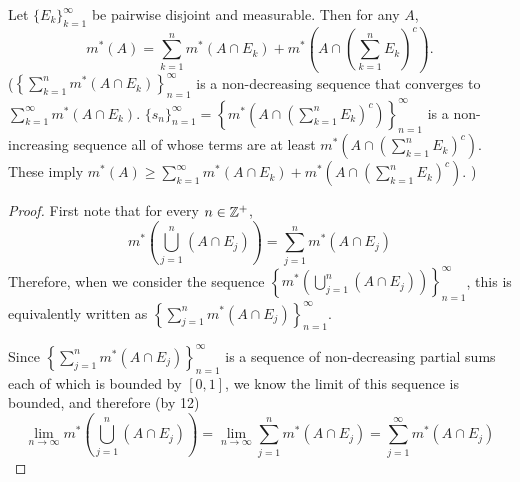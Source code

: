 \begin{pblm}%
	Let $\{E_k\}_{k=1}^\infty$ be pairwise disjoint and measurable. Then 
	for any $A$, 
	\begin{equation*}
		m^\ast(A) = \sum\limits_{k=1}^nm^\ast(A\cap E_k)+m^\ast
		\left(A\cap\left(\sum\limits_{k=1}^nE_k\right)^c\right).
	\end{equation*}
	($\left\{\sum\limits_{k=1}^n m^\ast(A\cap E_k)\right\}_{n=1}^\infty$ 
	is a non-decreasing sequence that converges to 
	$\sum\limits_{k=1}^\infty m^\ast(A\cap E_k)$.  
	$\{s_n\}_{n=1}^\infty = 
	\left\{
		m^\ast \left(A\cap\left(\sum\limits_{k=1}^nE_k\right)^c\right)
	\right\}_{n=1}^\infty$ 
	is a non-increasing sequence all of whose terms are at least 
	$m^\ast \left(A\cap\left(\sum\limits_{k=1}^nE_k\right)^c\right).$ These 
	imply $m^\ast (A) \ge \sum\limits_{k=1}^\infty m^\ast(A\cap E_k) + 
	m^\ast \left(A\cap\left(\sum\limits_{k=1}^nE_k\right)^c\right).$ )
\begin{proof}
	First note that for every $n \in \mathbb{Z}^+$, 
	\begin{equation*}
		m^\ast\left(\bigcup\limits_{j=1}^n(A\cap E_j)\right) = \sum\limits_{j=1}^n m^\ast(A \cap E_j)
	\end{equation*}
	Therefore, when we consider the sequence 
	$\left\{m^\ast\left(\bigcup\limits_{j=1}^n(A\cap E_j)\right)\right\}_{n=1}^\infty$, 
	this is equivalently written as $\left\{\sum\limits_{j=1}^nm^\ast(A\cap E_j)\right\}_{n=1}^\infty$. 

	Since $\left\{\sum\limits_{j=1}^nm^\ast(A\cap E_j)\right\}_{n=1}^\infty$ is a sequence of 
	non-decreasing partial sums each of which is bounded by $[0,1]$, we know the limit of this 
	sequence is bounded, and therefore (by 12)
	\begin{equation*}
		\lim\limits_{n\to\infty} m^\ast\left(\bigcup\limits_{j=1}^n(A\cap E_j)\right) = 
		\lim\limits_{n\to\infty} \sum\limits_{j=1}^nm^\ast(A\cap E_j) = \sum\limits_{j=1}^\infty m^\ast(A \cap E_j)
	\end{equation*}


\end{proof}
\end{pblm}
